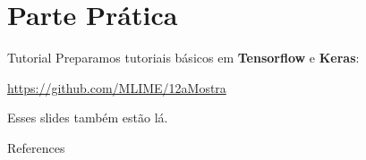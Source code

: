 \documentclass[10pt]{beamer}
\begin{document}
\section{Parte Prática}

\begin{frame}{Tutorial}
Preparamos tutoriais básicos em \textbf{Tensorflow} e \textbf{Keras}:
\vspace{0.3cm}
\begin{center}
\url{https://github.com/MLIME/12aMostra}
\end{center}

\vspace{0.3cm}

\alert{Esses slides também estão lá.}

\end{frame}

\begin{frame}[allowframebreaks]{References}

  
  

\end{frame}
\end{document}
